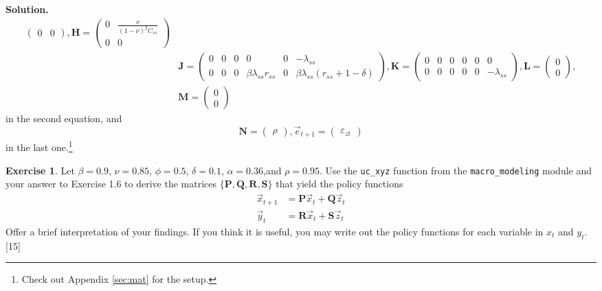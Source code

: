 \documentclass[11pt]{article}
\numberwithin{equation}{section} %
\numberwithin{figure}{section} %
\numberwithin{table}{section} %
\theoremstyle{definition}
\newtheorem{exercise}[theorem]{Exercise}
\newenvironment{solution}{\begin{addmargin}[2em]{0em} {\bf Solution. }}{\end{addmargin}}
\begin{document}
\begin{solution}
\begin{align*}
\begin{pmatrix}
            0 & 0
        \end{pmatrix}, \mathbf{H} = \begin{pmatrix}
            0 & \frac{\nu}{(1 - \nu)^2 C_{ss}} \\
            0 & 0
        \end{pmatrix} \\
        &\mathbf{J} = \begin{pmatrix}
            0 & 0 & 0 & 0 & 0 & -\lambda_{ss} \\
            0 & 0 & 0 & \beta \lambda_{ss} r_{ss} & 0 & \beta \lambda_{ss} (r_{ss} + 1 - \delta)
        \end{pmatrix}, \mathbf{K} = \begin{pmatrix}
            0 & 0 & 0 & 0 & 0 & 0 \\
            0 & 0 & 0 & 0 & 0 & -\lambda_{ss}
        \end{pmatrix}, \mathbf{L} = \begin{pmatrix}
            0 \\ 0
        \end{pmatrix}, \\
        &\mathbf{M} = \begin{pmatrix}
            0 \\ 0
        \end{pmatrix}
    \end{align*}
    in the second equation, and
    \[
        \mathbf{N} = \begin{pmatrix}
            \rho
        \end{pmatrix}, \vec{e}_{t+1} = \begin{pmatrix}
            \varepsilon_{zt}
        \end{pmatrix}
    \]
    in the last one.\footnote{Check out Appendix \ref{sec:mat} for the setup.}


\end{solution}


\begin{exercise}
    Let $\beta=0.9$, $\nu=0.85$, $\phi=0.5$, $\delta=0.1$, $\alpha=0.36$,and $\rho=0.95$. Use the \verb+uc_xyz+ function from the \verb+macro_modeling+ module and your answer to Exercise 1.6 to derive the matrices $\{\mathbf{P}, \mathbf{Q}, \mathbf{R}, \mathbf{S}\}$ that yield the policy functions
    \begin{align*}
        \vec{x}_{t+1} &= \mathbf{P} \vec{x}_t + \mathbf{Q} \vec{z}_t \\
        \vec{y}_t &= \mathbf{R} \vec{x}_t + \mathbf{S} \vec{z}_t 
    \end{align*}
    Offer a brief interpretation of your findings. If you think it is useful, you may write out the policy functions for each variable in $x_t$ and $y_t$. [15]
\end{exercise}
\end{document}
